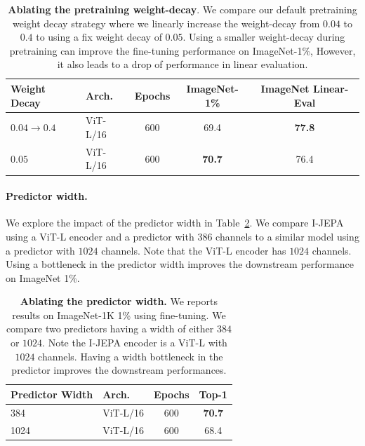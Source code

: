 \documentclass[10pt,twocolumn,letterpaper]{article}
\newcommand{\cc}{\cellcolor{fbApp}}
\newcommand{\putalg}{{I-JEPA}\xspace}
\begin{document}
\begin{table}[h]
     \centering
     \begin{tabular}{l l c c c}
         \bf\small Weight Decay & \bf\small Arch. & \bf\small Epochs & \bf\small ImageNet-1\% & \bf ImageNet Linear-Eval \\
         \toprule
         \cc \small $0.04 \rightarrow 0.4$  & \cc\small ViT-L/16 &\cc 600 &  \cc 69.4 & \cc\bf 77.8  \\
         \small $0.05$ & \small ViT-L/16 &  600 & \bf  70.7 & 76.4\\
     \end{tabular}
     \caption{\textbf{Ablating the pretraining weight-decay}.
       We compare our default pretraining  weight decay strategy where we linearly increase the weight-decay from $0.04$ to $0.4$ to using a fix weight decay of $0.05$. Using a smaller weight-decay during pretraining can improve the fine-tuning performance on ImageNet-1\%, However, it also leads to a drop of performance in linear evaluation.}
     \label{tb:ablation-weightdecay}
\end{table}


\paragraph{Predictor width.} We explore the impact of the predictor width in Table~\ref{tb:ablation-predwidth}. We compare \putalg using a ViT-L encoder and a predictor with  $386$ channels to a similar  model using a predictor with $1024$ channels. Note that the ViT-L encoder has  $1024$ channels. Using a bottleneck in the predictor width improves the downstream performance on ImageNet 1\%.

\begin{table}[h]
     \centering
     \begin{tabular}{l l c c}
         \bf\small Predictor Width & \bf\small Arch. & \bf\small Epochs & \bf\small Top-1 \\
         \toprule
         \cc\small 384  & \cc\small ViT-L/16 & \cc 600 & \cc\bf 70.7 \\
         \small 1024 & \small ViT-L/16 &  600 &   68.4
     \end{tabular}
     \caption{\textbf{Ablating the predictor width.} We reports results on  ImageNet-1K 1\% using fine-tuning. We compare two predictors having a width of either $384$ or $1024$. Note the \putalg encoder is a ViT-L with  $1024$ channels. Having a width bottleneck in the predictor improves the  downstream performances.}
     \label{tb:ablation-predwidth}
\end{table}
\end{document}

